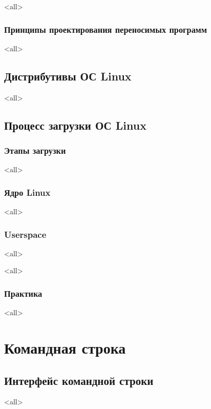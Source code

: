 \mode<all>{}

\subsection{Принципы проектирования переносимых программ}

\mode<all>{}

\section{Дистрибутивы ОС Linux}

\mode<all>{}

\section{Процесс загрузки ОС Linux}

\subsection{Этапы загрузки}

\mode<all>{}

\subsection{Ядро Linux}

\mode<all>{}

\subsection{Userspace}

\mode<all>{}

\mode<all>{}

\subsection{Практика}

\mode<all>{}


\chapter{Командная строка}

\section{Интерфейс командной строки}
\mode<all>{}

